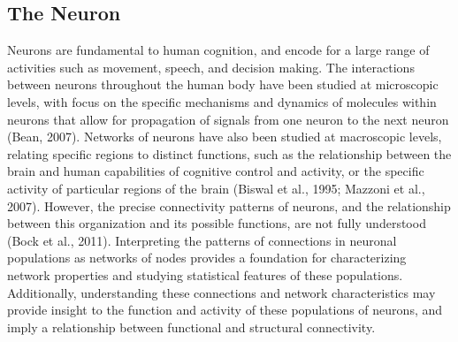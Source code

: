 \documentclass[11pt,titlepage]{article}
\begin{document}
\subsection{The Neuron}\label{ssec:Neuron}
Neurons are fundamental to human cognition, and encode for a large range of activities such as movement, speech, and decision making. The interactions between neurons throughout the human body have been studied at microscopic levels, with focus on the specific mechanisms and dynamics of molecules within neurons that allow for propagation of signals from one neuron to the next neuron (Bean, 2007). Networks of neurons have also been studied at macroscopic levels, relating specific regions to distinct functions, such as the relationship between the brain and human capabilities of cognitive control and activity, or the specific activity of particular regions of the brain (Biswal et al., 1995; Mazzoni et al., 2007). However, the precise connectivity patterns of neurons, and the relationship between this organization and its possible functions, are not fully understood (Bock et al., 2011). Interpreting the patterns of connections in neuronal populations as networks of nodes provides a foundation for characterizing network properties and studying statistical features of these populations. Additionally, understanding these connections and network characteristics may provide insight to the function and activity of these populations of neurons, and imply a relationship between functional and structural connectivity.\par

\end{document}

